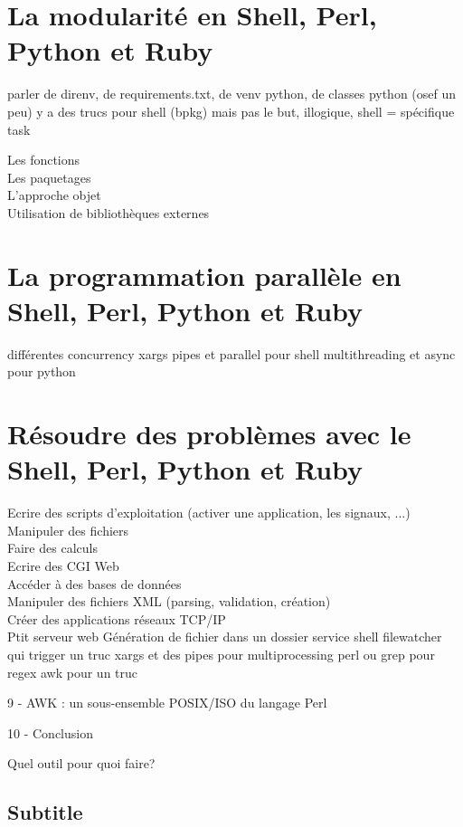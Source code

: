 \documentclass[11pt,a4paper]{article}
\begin{document}
\section{La modularité en Shell, Perl, Python et Ruby}

parler de direnv, de requirements.txt, de venv python, de classes python (osef un peu)
y a des trucs pour shell (bpkg) mais pas le but, illogique, shell = spécifique task

Les fonctions\\
Les paquetages\\
L'approche objet\\
Utilisation de bibliothèques externes\\



\section{La programmation parallèle en Shell, Perl, Python et Ruby}

différentes concurrency
xargs pipes et parallel pour shell
multithreading et async pour python

\section{Résoudre des problèmes avec le Shell, Perl, Python et Ruby}

Ecrire des scripts d'exploitation (activer une application, les signaux, ...)\\
Manipuler des fichiers\\
Faire des calculs\\
Ecrire des CGI Web\\
Accéder à des bases de données\\
Manipuler des fichiers XML (parsing, validation, création)\\
Créer des applications réseaux TCP/IP\\

Ptit serveur web
Génération de fichier dans un dossier
service shell filewatcher qui trigger un truc
xargs et des pipes pour multiprocessing
perl ou grep pour regex
awk pour un truc

9 - AWK : un sous-ensemble POSIX/ISO du langage Perl

10 - Conclusion

Quel outil pour quoi faire?



\subsection*{Subtitle}
\end{document}
